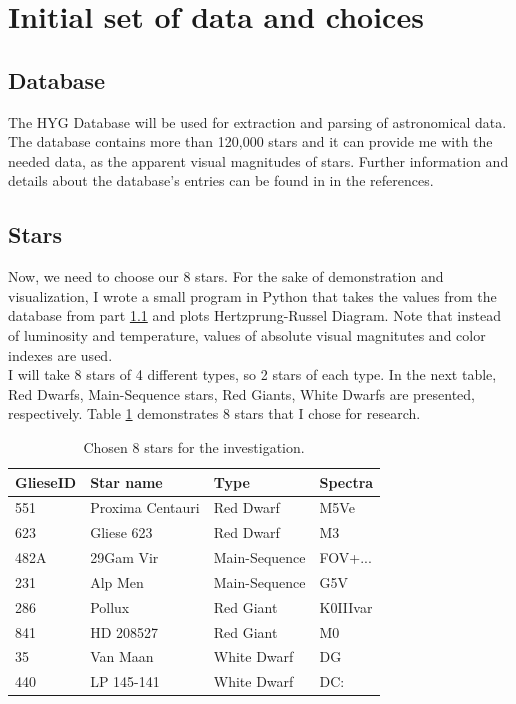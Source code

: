 \documentclass{article}
\begin{document}
  
\section{Initial set of data and choices}

  \subsection{Database}
  \label{database}
  The HYG Database \cite{hyg} will be used for extraction and parsing of astronomical data. The database contains more than 120,000 stars and it can provide me with the needed data, as the apparent visual magnitudes of stars. Further information and details about the database's entries can be found in in the references.\\  
  
  \subsection{Stars}
  
  Now, we need to choose our 8 stars. For the sake of demonstration and visualization, I wrote a small program in Python that takes the values from the database from part \ref{database} and plots Hertzprung-Russel Diagram. Note that instead of luminosity and temperature, values of absolute visual magnitutes and color indexes are used.\\
  
  I will take 8 stars of 4 different types, so 2 stars of each type. In the next table, Red Dwarfs, Main-Sequence stars, Red Giants, White Dwarfs are presented, respectively. Table \ref{stars} demonstrates 8 stars that I chose for research.\\
  
  \begin{table}[h!]
    \begin{center}
      \caption{Chosen 8 stars for the investigation.}
      \begin{tabular}{l | l | l | l}
        \textbf{GlieseID} & \textbf{Star name} & \textbf{Type} & \textbf{Spectra}\\
        \hline
        551  & Proxima Centauri & Red Dwarf     & M5Ve\\
        623  & Gliese 623       & Red Dwarf     & M3\\
        482A & 29Gam Vir        & Main-Sequence & FOV+...\\
        231  & Alp Men          & Main-Sequence & G5V\\
        286  & Pollux           & Red Giant     & K0IIIvar\\
        841  & HD 208527        & Red Giant     & M0\\
        35   & Van Maan         & White Dwarf   & DG\\
        440  & LP 145-141       & White Dwarf   & DC:\\
      \end{tabular}
      \label{stars}
    \end{center}
  \end{table}
  
\end{document}
